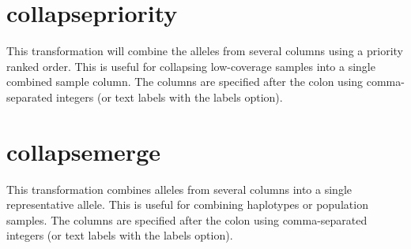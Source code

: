 \documentclass[letterpaper,11pt,english]{sphinxmanual}
\begin{document}
%
\begin{sphinxVerbatim}[commandchars=\\\{\}]
  
 
 
 
\end{sphinxVerbatim}


\section{collapsepriority}
\label{\detokenize{mvf_filter_modules:collapsepriority}}
This transformation will combine the alleles from several
columns using a priority ranked order. This is useful for collapsing
low-coverage samples into a single combined sample column.
The columns  are specified after the colon using comma-separated integers
(or text labels with the \textendash{}labels option).

%
\begin{sphinxVerbatim}[commandchars=\\\{\}]
  
 
 
 
\end{sphinxVerbatim}


\section{collapsemerge}
\label{\detokenize{mvf_filter_modules:collapsemerge}}
This transformation combines alleles from several columns
into a single representative allele. This is useful for
combining haplotypes or population samples. The columns
are specified after the colon using comma-separated integers
(or text labels with the \textendash{}labels option).
\end{document}
